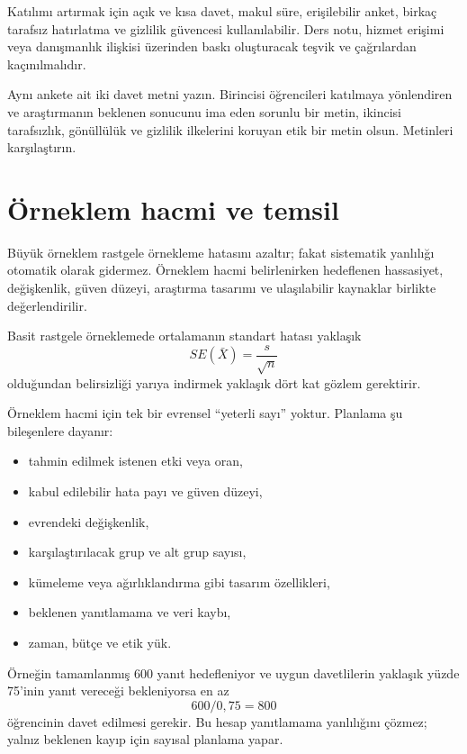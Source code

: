 Katılımı artırmak için açık ve kısa davet, makul süre, erişilebilir anket,
birkaç tarafsız hatırlatma ve gizlilik güvencesi kullanılabilir. Ders notu,
hizmet erişimi veya danışmanlık ilişkisi üzerinden baskı oluşturacak teşvik ve
çağrılardan kaçınılmalıdır.

\begin{etkinlik}
Aynı ankete ait iki davet metni yazın. Birincisi öğrencileri katılmaya
yönlendiren ve araştırmanın beklenen sonucunu ima eden sorunlu bir metin,
ikincisi tarafsızlık, gönüllülük ve gizlilik ilkelerini koruyan etik bir metin
olsun. Metinleri karşılaştırın.
\end{etkinlik}

\section{Örneklem hacmi ve temsil}

Büyük örneklem rastgele örnekleme hatasını azaltır; fakat sistematik yanlılığı
otomatik olarak gidermez. Örneklem hacmi belirlenirken hedeflenen hassasiyet,
değişkenlik, güven düzeyi, araştırma tasarımı ve ulaşılabilir kaynaklar birlikte
değerlendirilir.

Basit rastgele örneklemede ortalamanın standart hatası yaklaşık
\[
SE(\bar X)=\frac{s}{\sqrt n}
\]
olduğundan belirsizliği yarıya indirmek yaklaşık dört kat gözlem gerektirir.

Örneklem hacmi için tek bir evrensel ``yeterli sayı'' yoktur. Planlama şu
bileşenlere dayanır:

\begin{itemize}
  \item tahmin edilmek istenen etki veya oran,
  \item kabul edilebilir hata payı ve güven düzeyi,
  \item evrendeki değişkenlik,
  \item karşılaştırılacak grup ve alt grup sayısı,
  \item kümeleme veya ağırlıklandırma gibi tasarım özellikleri,
  \item beklenen yanıtlamama ve veri kaybı,
  \item zaman, bütçe ve etik yük.
\end{itemize}

Örneğin tamamlanmış 600 yanıt hedefleniyor ve uygun davetlilerin yaklaşık
yüzde 75'inin yanıt vereceği bekleniyorsa en az
\[
600/0{,}75=800
\]
öğrencinin davet edilmesi gerekir. Bu hesap yanıtlamama yanlılığını çözmez;
yalnız beklenen kayıp için sayısal planlama yapar.

